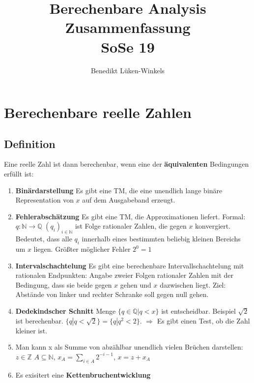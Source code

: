 \documentclass[ngerman]{scrartcl}
\title{Berechenbare Analysis \\ Zusammenfassung \\ SoSe 19}
\author{Benedikt Lüken-Winkels}
\begin{document}
\maketitle

\newpage

%
%
\section{Berechenbare reelle Zahlen}

\subsection{Definition}
Eine reelle Zahl ist dann berechenbar, wenn eine der \textbf{äquivalenten} Bedingungen erfüllt ist:
\begin{enumerate}
  \item \textbf{Binärdarstellung} Es gibt eine TM, die eine unendlich lange binäre Representation von $ x $ auf dem Ausgabeband erzeugt.
  \item \textbf{Fehlerabschätzung} Es gibt eine TM, die Approximationen liefert. Formal: $ q:\mathbb{N}\rightarrow \mathbb{Q} $ $ (q_{i})_{i \in \mathbb{N}} $ ist Folge rationaler Zahlen, die gegen $ x $ konvergiert. Bedeutet, dass alle $ q_i $ innerhalb eines bestimmten beliebig kleinen Bereichs um $ x $ liegen. Größter möglicher Fehler $ 2^0 = 1 $
  \item \textbf{Intervalschachtelung} Es gibt eine berechenbare Intervallschachtelung mit rationalen Endpunkten: Angabe zweier Folgen rationaler Zahlen mit der Bedingung, dass sie beide gegen $ x $ gehen und $ x $ dazwischen liegt. Ziel: Abstände von linker und rechter Schranke soll gegen null gehen.
  \item \textbf{Dedekindscher Schnitt} Menge $ \{q \in \mathbb{Q} | q < x \} $ ist entscheidbar. Beispiel $ \sqrt{2} $ ist berechenbar. $ \{ q | q < \sqrt{2} \} = \{ q | q^2 < 2\}$. $ \Rightarrow $ Es gibt einen Test, ob die Zahl kleiner ist.
  \item Man kann x als Summe von abzählbar unendlich vielen Brüchen darstellen: $ z \in \mathbb{Z} $ $ A \subseteq \mathbb{N} $, $ x_A = \sum_{i \in A} 2^{-i-1} $, $ x = z + x_A $
  \item Es exisitert eine \textbf{Kettenbruchentwicklung}
 \end{enumerate}
\end{document}
